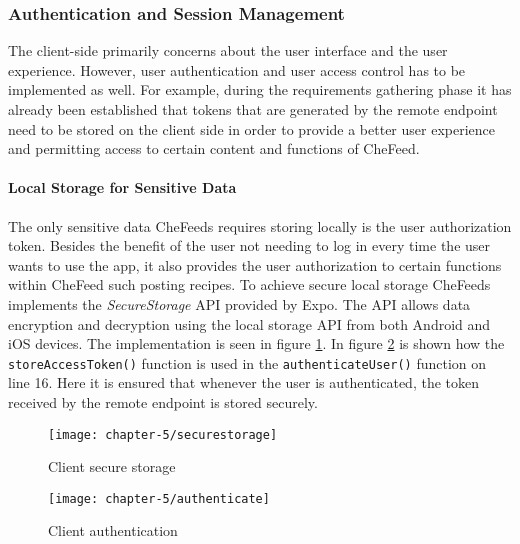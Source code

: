 \subsubsection{Authentication and Session Management}
The client-side primarily concerns about the user interface and the user experience. However, user authentication and user access control has to be implemented as well. For example, during the requirements gathering phase it has already been established that tokens that are generated by the remote endpoint need to be stored on the client side in order to provide a better user experience and permitting access to certain content and functions of CheFeed.

\paragraph{Local Storage for Sensitive Data}
The only sensitive data CheFeeds requires storing locally is the user authorization token. Besides the benefit of the user not needing to log in every time the user wants to use the app, it also provides the user authorization to certain functions within CheFeed such posting recipes. To achieve secure local storage CheFeeds implements the \emph{SecureStorage} API provided by Expo. The API allows data encryption and decryption using the local storage API from both Android and iOS devices. The implementation is seen in figure \ref{code:secure-storage-client}. In figure \ref{code:client-authenticate} is shown how the \verb|storeAccessToken()| function is used in the \verb|authenticateUser()| function on line 16. Here it is ensured that whenever the user is authenticated, the token received by the remote endpoint is stored securely.

\begin{figure}
    \centering
    \texttt{[image: chapter-5/securestorage]}
    \caption{Client secure storage}
    \label{code:secure-storage-client}
\end{figure}

\begin{figure}
    \centering
    \texttt{[image: chapter-5/authenticate]}
    \caption{Client authentication}
    \label{code:client-authenticate}
\end{figure}
